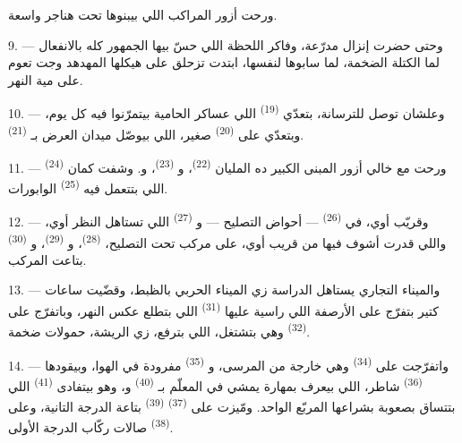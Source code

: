 ورحت أزور المراكب اللي بيبنوها تحت هناجر واسعة.

9. --- وحتى حضرت إنزال مدرّعة، وفاكر اللحظة اللي حسّ بيها الجمهور كله بالانفعال
لما الكتلة الضخمة، لما سابوها لنفسها، ابتدت تزحلق على هيكلها المهدهد وجت تعوم
على مية النهر.

10. --- وعلشان توصل للترسانة، بتعدّي  \textsuperscript{(19)}
اللي عساكر الحامية بيتمرّنوا فيه كل يوم، وبتعدّي على 
\textsuperscript{(20)} صغير، اللي بيوصّل ميدان العرض بـ
\textsuperscript{(21)}.

\VUsaut{3.0mm}
\VUsaut{3.0mm}

11. --- ورحت مع خالي أزور المبنى الكبير ده المليان 
\textsuperscript{(22)}، و \textsuperscript{(23)}، و. وشفت
كمان  \textsuperscript{(24)} اللي بتتعمل فيه 
\textsuperscript{(25)} الوابورات.

12. --- وقريّب أوي، في  \textsuperscript{(26)} --- أحواض التصليح ---
و \textsuperscript{(27)} اللي تستاهل النظر أوي، واللي قدرت
أشوف فيها من قريب أوي، على مركب تحت التصليح،  \textsuperscript{(28)}،
و \textsuperscript{(29)}، و \textsuperscript{(30)} بتاعت
المركب.

13. --- والميناء التجاري يستاهل الدراسة زي الميناء الحربي بالظبط، وقضّيت ساعات
كتير بتفرّج على الأرصفة اللي راسية عليها 
\textsuperscript{(31)} اللي بتطلع عكس النهر، وباتفرّج على 
\textsuperscript{(32)} وهي بتشتغل، اللي بترفع، زي الريشة، حمولات ضخمة.

\VUsaut{4.0mm}
\VUsaut{3.0mm}

14. --- واتفرّجت على  \textsuperscript{(34)} وهي خارجة من
المرسى، و \textsuperscript{(35)} مفرودة في الهوا، وبيقودها
 \textsuperscript{(36)} شاطر، اللي بيعرف بمهارة يمشي في  المعلّم بـ \textsuperscript{(40)} و،
وهو بيتفادى  \textsuperscript{(41)} اللي بتتساق بصعوبة بشراعها
المربّع الواحد. ومّيزت على  \textsuperscript{(37)}
 \textsuperscript{(39)} بتاعة الدرجة التانية، وعلى
 \textsuperscript{(38)} صالات ركّاب الدرجة الأولى.

